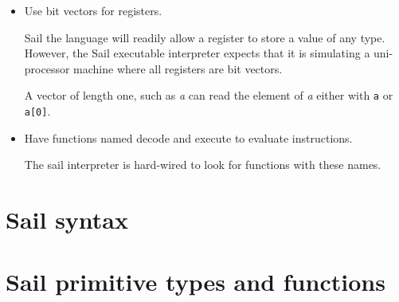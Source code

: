 \documentclass[11pt]{article}
\begin{document}
\begin{itemize}
\item Use bit vectors for registers.

Sail the language will readily allow a register to store a value of
any type. However, the Sail executable interpreter expects that it is
simulating a uni-processor machine where all registers are bit
vectors.

A vector of length one, such as \emph{a} can read the element of \emph{a}
either with {\tt a} or {\tt a[0]}.

\item Have functions named decode and execute to evaluate
  instructions.

The sail interpreter is hard-wired to look for functions with these names.

\end{itemize}



\section{Sail syntax}

\ottgrammartabular{
\ottl\ottinterrule
\ottannot\ottinterrule
\ottid\ottinterrule
\ottkid\ottinterrule
\ottbaseXXkind\ottinterrule
\ottkind\ottinterrule
\ottnexp\ottinterrule
\ottorder\ottinterrule
\ottbaseXXeffect\ottinterrule
\otteffect\ottinterrule
\otttyp\ottinterrule
\otttypXXarg\ottinterrule
\ottnXXconstraint\ottinterrule
\ottkindedXXid\ottinterrule
\ottquantXXitem\ottinterrule
\otttypquant\ottinterrule
\otttypschm\ottinterrule
\ottnameXXscmXXopt\ottinterrule
\otttypeXXdef\ottinterrule
\otttypeXXunion\ottinterrule
\ottindexXXrange\ottinterrule
\ottlit\ottinterrule
\ottsemiXXopt\ottinterrule
\ottpat\ottinterrule
\ottfpat\ottinterrule
\ottexp\ottinterrule
\ottlexp\ottinterrule
\ottfexp\ottinterrule
\ottfexps\ottinterrule
\ottoptXXdefault\ottinterrule
\ottpexp\ottinterrule
\otttannotXXopt\ottinterrule
\ottrecXXopt\ottinterrule
\otteffectXXopt\ottinterrule
\ottfuncl\ottinterrule
\ottfundef\ottinterrule
\ottletbind\ottinterrule
\ottvalXXspec\ottinterrule
\ottdefaultXXspec\ottinterrule
\ottscatteredXXdef\ottinterrule
\ottregXXid\ottinterrule
\ottaliasXXspec\ottinterrule
\ottdecXXspec\ottinterrule
\ottdef\ottinterrule
\ottdefs\ottinterrule}

\newpage
\section{Sail primitive types and functions}
\end{document}
